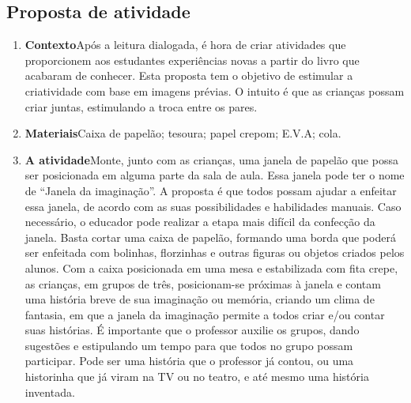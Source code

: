 \documentclass[11pt]{extarticle}
\begin{document}
\subsection{Proposta de atividade}



\begin{enumerate}
\item \textbf{Contexto}\quad Após a leitura dialogada, é hora de criar 
atividades que proporcionem aos estudantes experiências novas a partir do livro
que acabaram de conhecer.
Esta proposta tem o objetivo de estimular a criatividade com base em imagens prévias. O intuito é que as crianças possam criar juntas, estimulando a troca entre os pares.

\item \textbf{Materiais}\quad Caixa de papelão; tesoura; papel crepom; E.V.A; cola.

\item \textbf{A atividade}\quad Monte, junto com as crianças, uma janela de papelão que possa ser posicionada em alguma parte da sala de aula. Essa janela pode ter o nome de “Janela da imaginação”. A proposta é que todos possam ajudar a enfeitar essa janela, de acordo com as suas possibilidades e habilidades manuais. Caso necessário, o educador pode realizar a etapa mais difícil da confecção da janela. Basta cortar uma caixa de papelão, formando uma borda que poderá ser enfeitada com bolinhas, florzinhas e outras figuras ou objetos criados pelos alunos. Com a caixa posicionada em uma mesa e estabilizada com fita crepe, as crianças, em grupos de três, posicionam-se próximas à janela e contam uma história breve de sua imaginação ou memória, criando um clima de fantasia, em que a janela da imaginação permite a todos criar e/ou contar suas histórias. É importante que o professor auxilie os grupos, dando sugestões e estipulando um tempo para que todos no grupo possam participar. Pode ser uma história que o professor já contou, ou uma historinha que já viram na TV ou no teatro, e até mesmo uma história inventada.  



\end{enumerate}
\end{document}
